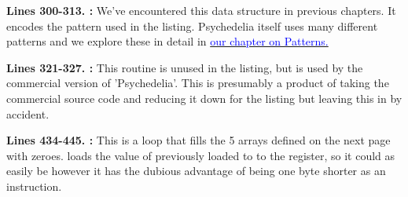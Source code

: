 \textbf{Lines 300-313. :} We've encountered this data structure in previous chapters. It encodes the pattern used in the listing.
Psychedelia itself uses many different patterns and we explore these in detail in
\hyperref[sec:patterns]{\textcolor{blue}{our chapter on Patterns.}} 

\bigskip
\bigskip
\bigskip
\bigskip
\bigskip
\bigskip
\bigskip
\bigskip
\bigskip
\bigskip
\bigskip
\bigskip
\bigskip
\textbf{Lines 321-327. :} This routine is unused in the listing, but is used by the commercial version of 'Psychedelia'. This is
presumably a product of taking the commercial source code and reducing it down for the listing but 
leaving this in by accident.

\bigskip
\bigskip
\bigskip
\bigskip
\bigskip
\bigskip
\bigskip
\textbf{Lines 434-445. :} This is a loop that fills the 5 arrays defined on the next page with zeroes.
 loads the value of  previously loaded to  to the  register, so it could as easily be 
however it has the dubious advantage of being one byte shorter as an instruction.

